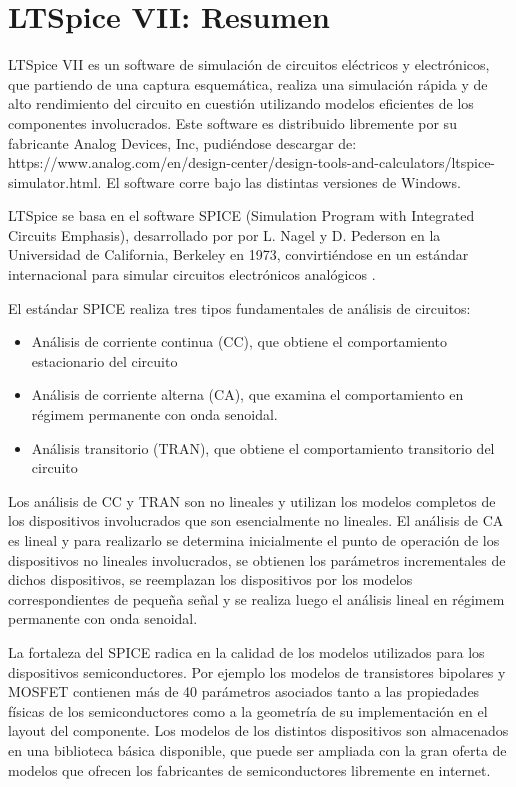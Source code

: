\chapter{LTSpice VII: Resumen }\label{LTspice}

\hspace{10pt} LTSpice VII es un software de simulación  de circuitos eléctricos y electrónicos, que partiendo de una captura esquemática, realiza una simulación rápida y de alto rendimiento del circuito en cuestión utilizando modelos eficientes de los componentes involucrados. Este software es distribuido libremente por su fabricante Analog Devices, Inc, pudiéndose descargar de: https://www.analog.com/en/design-center/design-tools-and-calculators/ltspice-simulator.html. El software corre bajo las distintas versiones de Windows.


LTSpice se basa en el software SPICE (Simulation Program with Integrated Circuits Emphasis), desarrollado por por L. Nagel y D. Pederson  en la Universidad de California, Berkeley en 1973, convirtién\-dose en un  estándar internacional para simular circuitos electrónicos analógicos \cite{Nagel75} \cite{queiros91}.

El estándar SPICE realiza tres tipos fundamentales de análisis de circuitos:

\begin{itemize}
    \item Análisis de corriente continua (CC), que obtiene el comportamiento estacionario del circuito
    \item Análisis de corriente alterna (CA), que examina el comportamiento en régimem permanente con onda senoidal.
    \item Análisis transitorio (TRAN), que obtiene  el comportamiento transitorio del circuito
\end{itemize}

Los análisis de CC y TRAN son no lineales y utilizan los modelos completos de los dispositivos involucrados que son esencialmente no lineales. El análisis de CA es lineal y para realizarlo se determina inicialmente el punto de operación de los dispositivos no lineales involucrados, se obtienen los parámetros incrementales de dichos dispositivos, se reemplazan los dispositivos por los modelos correspondientes de pequeña señal y se realiza luego el análisis lineal en régimem permanente con onda senoidal.

La fortaleza del SPICE radica en la calidad de los modelos utilizados para los dispositivos semiconduc\-tores. Por ejemplo los modelos de transistores bipolares y MOSFET contienen más de 40 parámetros asociados tanto a las propiedades físicas de los semiconductores como a la geometría de su implementación en el layout del componente. Los modelos de los distintos dispositivos son almacenados en una biblioteca básica disponible, que puede ser ampliada con la gran oferta de modelos que ofrecen los fabricantes de semiconductores libremente en internet.

